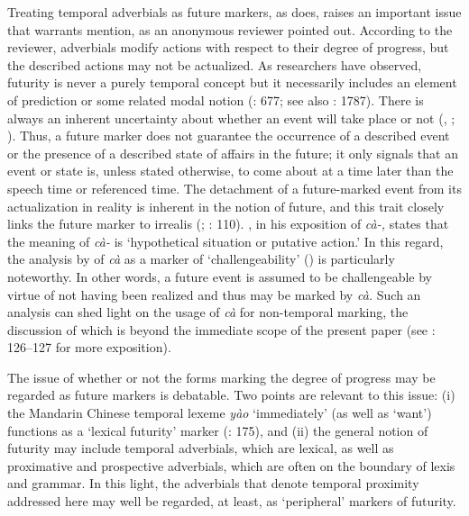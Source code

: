 \documentclass[output=paper,colorlinks,citecolor=brown]{langscibook}
\begin{document}
Treating temporal adverbials as future markers, as \citet{Supanvanich1973} does, raises an important issue that warrants mention, as an anonymous reviewer pointed out. According to the reviewer, adverbials modify actions with respect to their degree of progress, but the described actions may not be actualized. As researchers have observed, futurity is never a purely temporal concept but it necessarily includes an element of prediction or some related modal notion (\cite{Lyons1977}: 677; see also \cite{Salkie2010}: 1787). There is always an inherent uncertainty about whether an event will take place or not (\cite{Dahl1985}, \citeyear{Dahl2000}; \cite{JaeggiEtAl2022}). Thus, a future marker does not guarantee the occurrence of a described event or the presence of a described state of affairs in the future; it only signals that an event or state is, unless stated otherwise, to come about at a time later than the speech time or referenced time. The detachment of a future-marked event from its actualization in reality is inherent in the notion of future, and this trait closely links the future marker to irrealis (\cite{Noss1964}; \cite{Soithurum2010}: 110). \citet[165]{Noss1964}, in his exposition of \textit{cà-,} states that the meaning of \textit{cà- }is ‘hypothetical situation or putative action.’ In this regard, the analysis by \citet[123]{IwasakiIngkaphirom2005} of \textit{cà }as a marker of ‘challengeability’ (\cite{Givon1982}) is particularly noteworthy. In other words, a future event is assumed to be challengeable by virtue of not having been realized and thus may be marked by \textit{cà. }Such an analysis can shed light on the usage of \textit{cà }for non-temporal marking, the discussion of which is beyond the immediate scope of the present paper (see \cite{IwasakiIngkaphirom2005}: 126--127 for more exposition).

The issue of whether or not the forms marking the degree of progress may be regarded as future markers is debatable. Two points are relevant to this issue: (i) the Mandarin Chinese temporal lexeme \textit{yào} ‘immediately’ (as well as ‘want’) functions as a ‘lexical futurity’ marker (\cite{LiThompson1989}: 175), and (ii) the general notion of futurity may include temporal adverbials, which are lexical, as well as proximative and prospective adverbials, which are often on the boundary of lexis and grammar. In this light, the adverbials that denote temporal proximity addressed here may well be regarded, at least, as ‘peripheral’ markers of futurity. 
\end{document}
